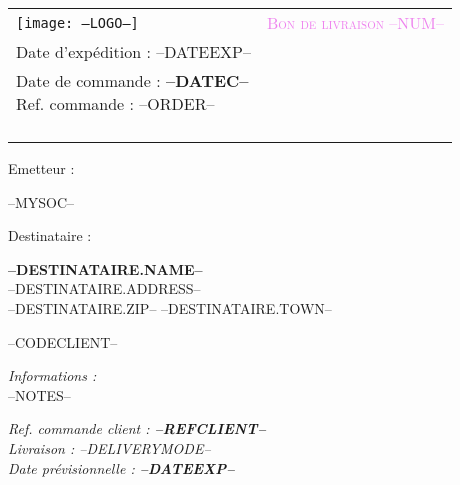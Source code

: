 \newcommand{\FOOT}{--FOOT--}



\newcommand{\specialcell}[2][c]{
	\parbox[#1]{8.3cm}{#2}}

\begin{tabular}{p{9cm} p{8cm}}
    \vspace{0pt} 
    \texttt{[image: --LOGO--]}
    & 
    \vspace{0pt}
   \raggedleft
	\textcolor{violet}{\textsc{\Large Bon de livraison --NUM--}}\\
	Date d'exp\'edition : --DATEEXP--\\
    {\small Date de commande : \textbf{--DATEC--}\\
	Ref. commande : --ORDER--\\}~\\
\end{tabular}


\begin{minipage}[t]{0.40\textwidth}
{\small Emetteur :}\\
\begin{fminipage}
--MYSOC--
\end{fminipage}
\end{minipage}
\hspace{1cm}
\begin{minipage}[t]{0.52\textwidth}
{\small Destinataire :}

\begin{fminipage}
\textbf{\large --DESTINATAIRE.NAME--}\\
--DESTINATAIRE.ADDRESS--\\
\textsc{--DESTINATAIRE.ZIP-- --DESTINATAIRE.TOWN--}\\
\begin{minipage}{\textwidth}
\flushright
{\tiny --CODECLIENT--}
\end{minipage}
\end{fminipage}
\end{minipage}

\begin{minipage}[t]{0.60\textwidth}
{\small \it Informations :}\\
--NOTES-- \\
\end{minipage}
\hspace{1cm}
\begin{minipage}[t]{0.32\textwidth}
\begin{flushright}
{\it Ref. commande client : \textbf{--REFCLIENT--}}\\
\vspace{1em}
{\it Livraison : --DELIVERYMODE--}\\
{\it Date prévisionnelle : \textbf{--DATEEXP--}}
\vspace{1em}
\end{flushright}
\end{minipage}

